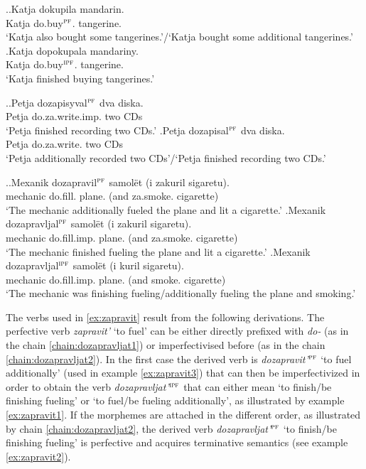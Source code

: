 \ex.\ag.\label{ex:do:kupit}Katja dokupila mandarin.\\
Katja do.buy$^{\textsc{pf}}$. tangerine.\\
\trans `Katja also bought some tangerines.'/`Katja bought some additional tangerines.'
\bg.\label{ex:do:pokupat}Katja dopokupala mandariny.\\
Katja do.buy$^{\textsc{ipf}}$. tangerine.\\
\trans `Katja finished buying tangerines.'

\ex.\ag.\label{ex:do:zapisyvat}Petja dozapisyval$^{\textsc{pf}}$ dva diska.\\
Petja do.za.write.imp. two CDs\\
\trans `Petja finished recording two CDs.'
\bg.\label{ex:do:zapisat}Petja dozapisal$^{\textsc{pf}}$ dva diska.\\
Petja do.za.write. two CDs\\
\trans `Petja additionally recorded two CDs'/`Petja finished recording two CDs.'

\ex.\label{ex:zapravit}\ag.\label{ex:zapravit3}Mexanik dozapravil$^{\textsc{pf}}$ samol\"et (i zakuril sigaretu).\\
mechanic do.fill. plane. (and za.smoke. cigarette)\\
\trans `The mechanic additionally fueled the plane and lit a cigarette.'
\bg.\label{ex:zapravit2}Mexanik dozapravljal$^{\textsc{pf}}$ samol\"et (i zakuril sigaretu).\\
mechanic do.fill.imp. plane. (and za.smoke. cigarette)\\
\trans `The mechanic finished fueling the plane and lit a cigarette.'
\bg.\label{ex:zapravit1}Mexanik dozapravljal$^{\textsc{ipf}}$ samol\"et (i kuril sigaretu).\\
mechanic do.fill.imp. plane. (and smoke. cigarette)\\
\trans `The mechanic was finishing fueling/additionally fueling the plane and smoking.'

The verbs used in \ref{ex:zapravit} result from the following derivations. The perfective verb  \textit{zapravit'} `to fuel' can be either directly prefixed with \textit{do-}   (as in the chain \ref{chain:dozapravljat1}) or imperfectivised before (as in the chain \ref{chain:dozapravljat2}). In the first case the derived verb is \textit{dozapravit'}$^{\textsc{pf}}$ `to fuel additionally' (used in example \ref{ex:zapravit3}) that can then be imperfectivized in order to obtain the verb \textit{dozapravljat'}$^{\textsc{ipf}}$ that can either mean `to finish/be finishing fueling' or `to fuel/be fueling additionally', as illustrated by example \ref{ex:zapravit1}. If the morphemes are attached in the different order, as illustrated by chain \ref{chain:dozapravljat2}, the derived verb \textit{dozapravljat'}$^{\textsc{pf}}$ `to finish/be finishing fueling' is perfective and acquires terminative  semantics (see example \ref{ex:zapravit2}).

